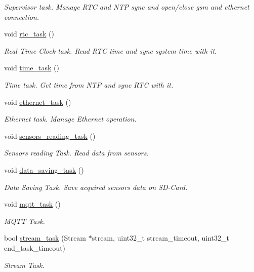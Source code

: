\begin{DoxyCompactItemize}
\begin{DoxyCompactList}\small\item\em Supervisor task. Manage R\+TC and N\+TP sync and open/close gsm and ethernet connection. \end{DoxyCompactList}\item 
void \hyperlink{rmap_8ino_a52f7fb7ebbd710f2a06b3f6e47c7e7e3}{rtc\+\_\+task} ()
\begin{DoxyCompactList}\small\item\em Real Time Clock task. Read R\+TC time and sync system time with it. \end{DoxyCompactList}\item 
void \hyperlink{rmap_8ino_a35c29025c5ef3d135b8c2b038be3f8df}{time\+\_\+task} ()
\begin{DoxyCompactList}\small\item\em Time task. Get time from N\+TP and sync R\+TC with it. \end{DoxyCompactList}\item 
void \hyperlink{rmap_8ino_abac8959915b759aa6429243ab9599ee3}{ethernet\+\_\+task} ()
\begin{DoxyCompactList}\small\item\em Ethernet task. Manage Ethernet operation. \end{DoxyCompactList}\item 
void \hyperlink{rmap_8ino_ad3efe51e17cb8205a24267c2992a12d4}{sensors\+\_\+reading\+\_\+task} ()
\begin{DoxyCompactList}\small\item\em Sensors reading Task. Read data from sensors. \end{DoxyCompactList}\item 
void \hyperlink{rmap_8ino_a1c6cee0cbd43bbe1215f13cab2434347}{data\+\_\+saving\+\_\+task} ()
\begin{DoxyCompactList}\small\item\em Data Saving Task. Save acquired sensors data on S\+D-\/\+Card. \end{DoxyCompactList}\item 
void \hyperlink{rmap_8ino_a161bca6629368a46242fec07a965966a}{mqtt\+\_\+task} ()
\begin{DoxyCompactList}\small\item\em M\+Q\+TT Task. \end{DoxyCompactList}\item 
bool \hyperlink{rmap_8ino_a21575354e8ec54fa31f581ed1838be79}{stream\+\_\+task} (Stream $\ast$stream, uint32\+\_\+t stream\+\_\+timeout, uint32\+\_\+t end\+\_\+task\+\_\+timeout)
\begin{DoxyCompactList}\small\item\em Stream Task. \end{DoxyCompactList}\end{DoxyCompactItemize}


